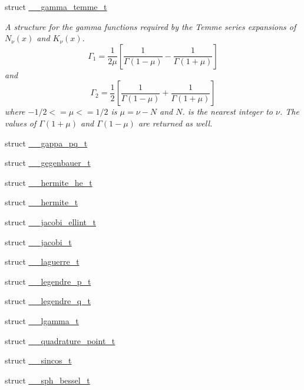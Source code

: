\begin{DoxyCompactItemize}
\item 
struct \hyperlink{struct____gnu__cxx_1_1____gamma__temme__t}{\+\_\+\+\_\+gamma\+\_\+temme\+\_\+t}
\begin{DoxyCompactList}\small\item\em A structure for the gamma functions required by the Temme series expansions of $ N_\nu(x) $ and $ K_\nu(x) $. \[ \Gamma_1 = \frac{1}{2\mu} \left[\frac{1}{\Gamma(1 - \mu)} - \frac{1}{\Gamma(1 + \mu)}\right] \] and \[ \Gamma_2 = \frac{1}{2} \left[\frac{1}{\Gamma(1 - \mu)} + \frac{1}{\Gamma(1 + \mu)}\right] \] where $ -1/2 <= \mu <= 1/2 $ is $ \mu = \nu - N $ and $ N $. is the nearest integer to $ \nu $. The values of $ \Gamma(1 + \mu) $ and $ \Gamma(1 - \mu) $ are returned as well. \end{DoxyCompactList}\item 
struct \hyperlink{struct____gnu__cxx_1_1____gappa__pq__t}{\+\_\+\+\_\+gappa\+\_\+pq\+\_\+t}
\item 
struct \hyperlink{struct____gnu__cxx_1_1____gegenbauer__t}{\+\_\+\+\_\+gegenbauer\+\_\+t}
\item 
struct \hyperlink{struct____gnu__cxx_1_1____hermite__he__t}{\+\_\+\+\_\+hermite\+\_\+he\+\_\+t}
\item 
struct \hyperlink{struct____gnu__cxx_1_1____hermite__t}{\+\_\+\+\_\+hermite\+\_\+t}
\item 
struct \hyperlink{struct____gnu__cxx_1_1____jacobi__ellint__t}{\+\_\+\+\_\+jacobi\+\_\+ellint\+\_\+t}
\item 
struct \hyperlink{struct____gnu__cxx_1_1____jacobi__t}{\+\_\+\+\_\+jacobi\+\_\+t}
\item 
struct \hyperlink{struct____gnu__cxx_1_1____laguerre__t}{\+\_\+\+\_\+laguerre\+\_\+t}
\item 
struct \hyperlink{struct____gnu__cxx_1_1____legendre__p__t}{\+\_\+\+\_\+legendre\+\_\+p\+\_\+t}
\item 
struct \hyperlink{struct____gnu__cxx_1_1____legendre__q__t}{\+\_\+\+\_\+legendre\+\_\+q\+\_\+t}
\item 
struct \hyperlink{struct____gnu__cxx_1_1____lgamma__t}{\+\_\+\+\_\+lgamma\+\_\+t}
\item 
struct \hyperlink{struct____gnu__cxx_1_1____quadrature__point__t}{\+\_\+\+\_\+quadrature\+\_\+point\+\_\+t}
\item 
struct \hyperlink{struct____gnu__cxx_1_1____sincos__t}{\+\_\+\+\_\+sincos\+\_\+t}
\item 
struct \hyperlink{struct____gnu__cxx_1_1____sph__bessel__t}{\+\_\+\+\_\+sph\+\_\+bessel\+\_\+t}

\end{DoxyCompactItemize}
